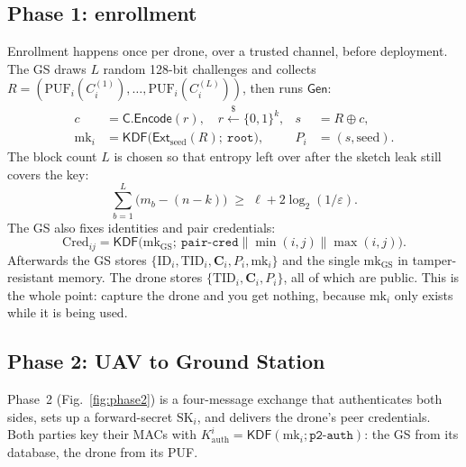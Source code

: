 \documentclass[conference]{IEEEtran}
\begin{document}
\subsection{Phase 1: enrollment}
\label{sec:p1}

Enrollment happens once per drone, over a trusted channel, before deployment.
The GS draws $L$ random 128-bit challenges and collects
$R = (\mathrm{PUF}_i(C_i^{(1)}), \dots, \mathrm{PUF}_i(C_i^{(L)}))$, then runs
$\mathsf{Gen}$:
\begin{align}
c &= \mathsf{C}.\mathsf{Encode}(r),\quad r \xleftarrow{\$} \{0,1\}^k, &
s &= R \oplus c, \\
\text{mk}_i &= \mathsf{KDF}\big(\mathsf{Ext}_{\text{seed}}(R);\ \texttt{root}\big), &
P_i &= (s, \text{seed}).
\end{align}
The block count $L$ is chosen so that entropy left over after the sketch leak
still covers the key:
\begin{equation}
\textstyle\sum_{b=1}^{L}\big(m_b - (n-k)\big) \;\ge\; \ell + 2\log_2(1/\varepsilon).
\label{eq:budget}
\end{equation}
The GS also fixes identities and pair credentials:
\begin{equation}
\text{Cred}_{ij} = \mathsf{KDF}\big(\text{mk}_{\text{GS}};\
  \texttt{pair-cred} \| \min(i,j) \| \max(i,j)\big).
\end{equation}
Afterwards the GS stores $\{\text{ID}_i, \text{TID}_i, \bm{C}_i, P_i, \text{mk}_i\}$
and the single $\text{mk}_{\text{GS}}$ in tamper-resistant memory. The drone
stores $\{\text{TID}_i, \bm{C}_i, P_i\}$, all of which are public. This is the
whole point: capture the drone and you get nothing, because $\text{mk}_i$ only
exists while it is being used.

\subsection{Phase 2: UAV to Ground Station}
\label{sec:p2}

Phase~2 (Fig.~\ref{fig:phase2}) is a four-message exchange that authenticates
both sides, sets up a forward-secret $\text{SK}_i$, and delivers the drone's
peer credentials. Both parties key their MACs with
$K^{i}_{\text{auth}} = \mathsf{KDF}(\text{mk}_i; \texttt{p2-auth})$: the GS from
its database, the drone from its PUF.
\end{document}
